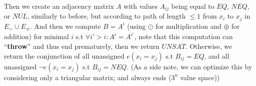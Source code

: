 \documentclass[a4paper,12pt]{article} %
\begin{document}
Then we create an adjacency matrix $A$ with values $A_{ij}$ being equal to $EQ$, $NEQ$, or $NUL$, similarly to before, but according to path of length $\leq1$ from $x_i$ to $x_j$ in $E_= \cup E_{\neq}$. And then we compute $B = A^i$ (using $\odot$ for multiplication and $\oplus$ for addition) for minimal $i$ s.t $\forall i' > i: A^i = A^{i'}$, note that this computation can ``\textbf{throw}'' and thus end prematurely, then we return $UNSAT$. Otherwise, we return the conjunction of all unassigned $e(x_i = x_j)$ s.t $B_{ij} = EQ$, and all unassigned $\neg e(x_i = x_j)$ s.t $B_{ij} = NEQ$. (As a side note, we can optimize this by considering only a triangular matrix; and always ends ($3^n$ value space))
\end{document}
